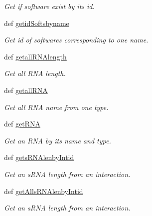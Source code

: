 \begin{DoxyCompactItemize}
\begin{DoxyCompactList}\small\item\em \-Get if software exist by its id. \end{DoxyCompactList}\item 
def \hyperlink{classirna_1_1iRNA__stat_1_1Sqlite__manager_1_1Sqlite__manager_a0db853c00656c62d2b523caecead9b9d}{getid\-Softsbyname}
\begin{DoxyCompactList}\small\item\em \-Get id of softwares corresponding to one name. \end{DoxyCompactList}\item 
def \hyperlink{classirna_1_1iRNA__stat_1_1Sqlite__manager_1_1Sqlite__manager_ac9165f2a59986bab64945cb1604673cd}{getall\-R\-N\-Alength}
\begin{DoxyCompactList}\small\item\em \-Get all \-R\-N\-A length. \end{DoxyCompactList}\item 
def \hyperlink{classirna_1_1iRNA__stat_1_1Sqlite__manager_1_1Sqlite__manager_a6e6259a30dabce21cd72a3d39edaecee}{getall\-R\-N\-A}
\begin{DoxyCompactList}\small\item\em \-Get all \-R\-N\-A name from one type. \end{DoxyCompactList}\item 
def \hyperlink{classirna_1_1iRNA__stat_1_1Sqlite__manager_1_1Sqlite__manager_a12c19b43a4b033cc35cc2c10f0ec4bad}{get\-R\-N\-A}
\begin{DoxyCompactList}\small\item\em \-Get an \-R\-N\-A by its name and type. \end{DoxyCompactList}\item 
def \hyperlink{classirna_1_1iRNA__stat_1_1Sqlite__manager_1_1Sqlite__manager_aaf2cbae86c4e31f49814aebd7b84b540}{gets\-R\-N\-Alenby\-Intid}
\begin{DoxyCompactList}\small\item\em \-Get an s\-R\-N\-A length from an interaction. \end{DoxyCompactList}\item 
def \hyperlink{classirna_1_1iRNA__stat_1_1Sqlite__manager_1_1Sqlite__manager_a7cda4ec3f3d451c33fb8c7c32109b027}{get\-Alls\-R\-N\-Alenby\-Intid}
\begin{DoxyCompactList}\small\item\em \-Get an s\-R\-N\-A length from an interaction. \end{DoxyCompactList}\item 

\end{DoxyCompactItemize}

